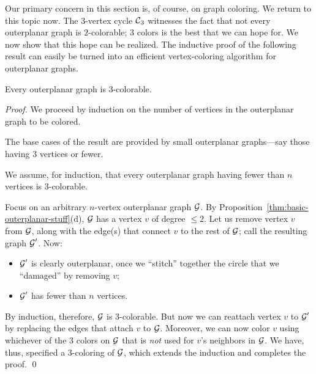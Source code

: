 \bigskip

Our primary concern in this section is, of course, on graph coloring.
We return to this topic now.  The $3$-vertex cycle $\mbox{$\cal C$}_3$ witnesses the
fact that not every outerplanar graph is $2$-colorable; $3$ colors is
the best that we can hope for.  We now show that this hope can be
realized.  The inductive proof of the following result can easily be
turned into an efficient vertex-coloring algorithm for outerplanar
graphs.

\begin{prop}
\label{thm:OP-3-colorability}
Every outerplanar graph is $3$-colorable.
\end{prop}

\begin{proof}
We proceed by induction on the number of vertices in the outerplanar
graph to be colored.

The base cases of the result are provided by small outerplanar
graphs---say those having $3$ vertices or fewer.

We assume, for induction, that every outerplanar graph having fewer
than $n$ vertices is $3$-colorable.

Focus on an arbitrary $n$-vertex outerplanar graph $\mbox{$\cal G$}$.  By
Proposition~\ref{thm:basic-outerplanar-stuff}(d), $\mbox{$\cal G$}$ has a vertex $v$
of degree $\leq 2$.  Let us remove vertex $v$ from $\mbox{$\cal G$}$, along with the
edge(s) that connect $v$ to the rest of $\mbox{$\cal G$}$; call the resulting graph
$\mbox{$\cal G$}'$.  Now: 
\begin{itemize}
\item
$\mbox{$\cal G$}'$ is clearly outerplanar, once we ``stitch'' together the circle that we ``damaged'' 
by removing $v$;
\item
$\mbox{$\cal G$}'$ has fewer than $n$ vertices.
\end{itemize}
By induction, therefore, $\mbox{$\cal G$}$ is $3$-colorable.  But now we can reattach vertex $v$ to $\mbox{$\cal G$}'$
by replacing the edges that attach $v$ to $\mbox{$\cal G$}$.  Moreover, we can now color $v$ using
whichever of the $3$ colors on $\mbox{$\cal G$}$ that is {\em not} used for $v$'s neighbors in $\mbox{$\cal G$}$.
We have, thus, specified a $3$-coloring of $\mbox{$\cal G$}$, which extends the
induction and completes the proof.  \qed
\end{proof}




